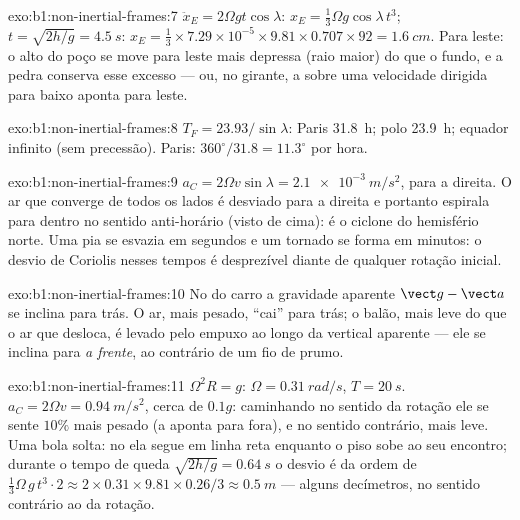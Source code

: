 \begin{solution}{exo:b1:non-inertial-frames:7}
$\ddot x_E = 2\Omega gt\cos\lambda$: $x_E = \tfrac13\Omega g\cos\lambda\,t^3$; $t =
\sqrt{2h/g} = \qty{4.5}{s}$: $x_E = \tfrac13 \times 7.29\times10^{-5} \times 9.81
\times 0.707 \times 92 = \qty{1.6}{cm}$. Para leste: o alto do poço se move
para leste mais depressa (raio maior) do que o fundo, e a pedra conserva
esse excesso --- ou, no  girante, a  sobre uma
velocidade dirigida para baixo aponta para leste.
\end{solution}

\begin{solution}{exo:b1:non-inertial-frames:8}
$T_F = 23.93/\sin\lambda$: Paris \qty{31.8}{h}; polo \qty{23.9}{h}; equador
infinito (sem precessão). Paris: $360^\circ/31.8 = 11.3^\circ$ por hora.
\end{solution}

\begin{solution}{exo:b1:non-inertial-frames:9}
$a_C = 2\Omega v\sin\lambda = \qty{2.1e-3}{m/s^2}$, para a direita. O ar que
converge de todos os lados é desviado para a direita e portanto espirala
para dentro no sentido anti-horário (visto de cima): é o ciclone do
hemisfério norte. Uma pia se esvazia em segundos e um tornado se forma em
minutos: o desvio de Coriolis nesses tempos é desprezível diante de
qualquer rotação inicial.
\end{solution}

\begin{solution}{exo:b1:non-inertial-frames:10}
No  do carro a gravidade aparente $\vect g - \vect a$ se inclina
para trás. O ar, mais pesado, ``cai'' para trás; o balão, mais leve do que o
ar que desloca, é levado pelo empuxo ao longo da vertical aparente ---
ele se inclina para \emph{a frente}, ao contrário de um fio de prumo.
\end{solution}

\begin{solution}{exo:b1:non-inertial-frames:11}
$\Omega^2R = g$: $\Omega = \qty{0.31}{rad/s}$, $T = \qty{20}{s}$. $a_C = 2\Omega v
= \qty{0.94}{m/s^2}$, cerca de $0.1g$: caminhando no sentido da rotação ele
se sente $10\%$ mais pesado (a  aponta para fora), e no
sentido contrário, mais leve. Uma bola solta: no  ela
segue em linha reta enquanto o piso sobe ao seu encontro; durante o tempo
de queda $\sqrt{2h/g} = \qty{0.64}{s}$ o desvio é da ordem de
$\tfrac13\Omega\,g\,t^3 \cdot 2 \approx 2 \times 0.31 \times
9.81 \times 0.26/3 \approx \qty{0.5}{m}$ --- alguns decímetros, no sentido
contrário ao da rotação.
\end{solution}

